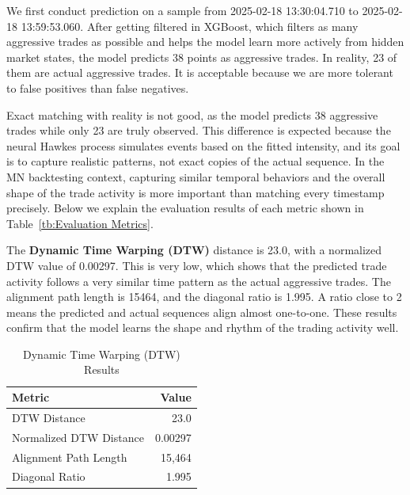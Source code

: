 We first conduct prediction on a sample from 2025-02-18 13:30:04.710 to 2025-02-18 13:59:53.060. After getting filtered in XGBoost, which filters as many aggressive trades as possible and helps the model learn more actively from hidden market states, the model predicts 38 points as aggressive trades. In reality, 23 of them are actual aggressive trades. It is acceptable because we are more tolerant to false positives than false negatives.

Exact matching with reality is not good, as the model predicts 38 aggressive trades while only 23 are truly observed. This difference is expected because the neural Hawkes process simulates events based on the fitted intensity, and its goal is to capture realistic patterns, not exact copies of the actual sequence. In the MN backtesting context, capturing similar temporal behaviors and the overall shape of the trade activity is more important than matching every timestamp precisely. Below we explain the evaluation results of each metric shown in Table~\ref{tb:Evaluation Metrics}.


The \textbf{Dynamic Time Warping (DTW)} distance is 23.0, with a normalized DTW value of 0.00297. This is very low, which shows that the predicted trade activity follows a very similar time pattern as the actual aggressive trades. The alignment path length is 15464, and the diagonal ratio is 1.995. A ratio close to 2 means the predicted and actual sequences align almost one-to-one. These results confirm that the model learns the shape and rhythm of the trading activity well.
\begin{table}[H]
    \centering
    \caption{Dynamic Time Warping (DTW) Results}
    \label{tb:dtw-results}
    \begin{tabular}{lr}
    \toprule
    Metric & Value \\
    \midrule
    DTW Distance & 23.0 \\
    Normalized DTW Distance & 0.00297 \\
    Alignment Path Length & 15,464 \\
    Diagonal Ratio & 1.995 \\
    \bottomrule
    \end{tabular}
\end{table}

